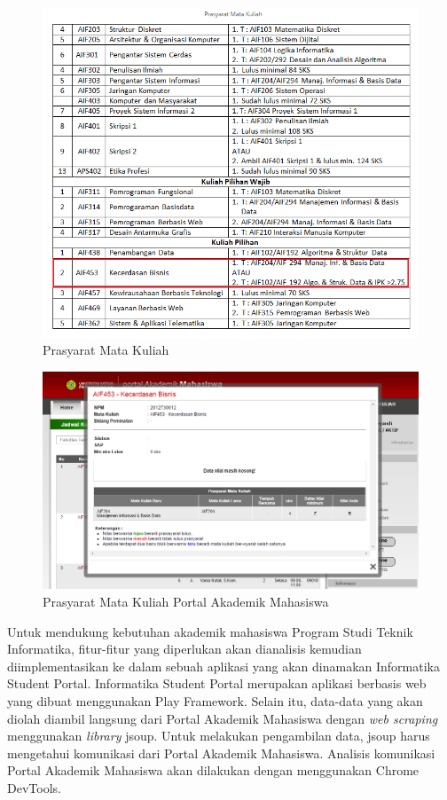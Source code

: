 \begin{figure}[H]
	\centering
	\includegraphics[scale=0.5]{Gambar/contoh-tinyurl}
	\caption{Prasyarat Mata Kuliah\cite{prasyaratIT}}
	\label{fig:1_prasyarat_tinyurl}
\end{figure}

\begin{figure}[H]
	\centering
	\includegraphics[scale=0.5]{Gambar/contoh-portal}
	\caption{Prasyarat Mata Kuliah Portal Akademik Mahasiswa\cite{studentportalunpar}}
	\label{fig:1_prasyarat_student_portal}
\end{figure}

Untuk mendukung kebutuhan akademik mahasiswa Program Studi Teknik Informatika, fitur-fitur yang diperlukan akan dianalisis kemudian diimplementasikan ke dalam sebuah aplikasi yang akan dinamakan Informatika Student Portal. Informatika Student Portal merupakan aplikasi berbasis web yang dibuat menggunakan Play Framework. Selain itu, data-data yang akan diolah diambil langsung dari Portal Akademik Mahasiswa dengan \textit{web scraping} menggunakan \textit{library} jsoup. Untuk melakukan pengambilan data, jsoup harus mengetahui komunikasi dari Portal Akademik Mahasiswa. Analisis komunikasi Portal Akademik Mahasiswa akan dilakukan dengan menggunakan Chrome DevTools. 

